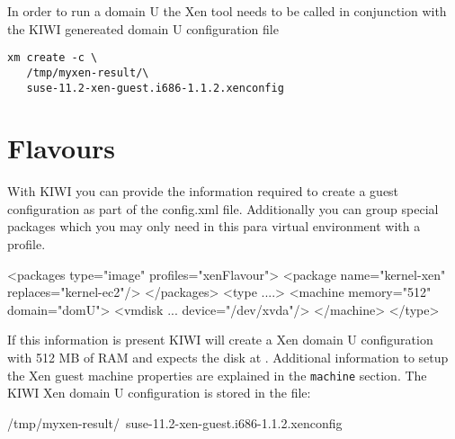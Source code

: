 In order to run a domain U the Xen tool  needs to be called
in conjunction with the KIWI genereated domain U configuration file

\begin{Command}{13cm}
\begin{verbatim}
xm create -c \
   /tmp/myxen-result/\
   suse-11.2-xen-guest.i686-1.1.2.xenconfig
\end{verbatim}
\end{Command}

\section{Flavours}

With KIWI you can provide the information
required to create a guest configuration as part of the config.xml
file. Additionally you can group special packages which you may only
need in this para virtual environment with a profile.

\begin{xml}
<packages type="image" profiles="xenFlavour">
   <package name="kernel-xen" replaces="kernel-ec2"/>
</packages>
<type ....>
   <machine memory="512" domain="domU">
      <vmdisk ... device="/dev/xvda"/>
   </machine>
</type>
\end{xml}

If this information is present KIWI will create a Xen domain U
configuration with 512 MB of RAM and expects the disk at .
Additional information to setup the Xen guest machine properties are
explained in the \texttt{machine} section. The KIWI Xen domain U
configuration is stored in the file:

\begin{Command}{13cm}
/tmp/myxen-result/\
    suse-11.2-xen-guest.i686-1.1.2.xenconfig
\end{Command}
